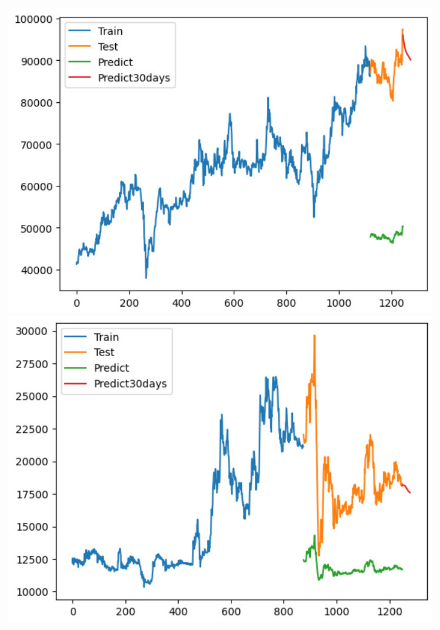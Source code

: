 \begin{figure}[H]
\begin{minipage}{0.15\textwidth}
    \end{minipage}
    \hfill
        \begin{minipage}{0.15\textwidth}
    \centering
    \includegraphics[width=1\textwidth]{resources/chapter-5/result/VCB_LSTM_9_1.jpg}
    \end{minipage}
    \hfill
    \begin{minipage}{0.15\textwidth}
    \centering
    \includegraphics[width=1\textwidth]{resources/chapter-5/result/EXB_LSTM_7_3.jpg}
    \end{minipage}
    \hfill
    \begin{minipage}{0.15\textwidth}
    \centering

\end{minipage}
\end{figure}
